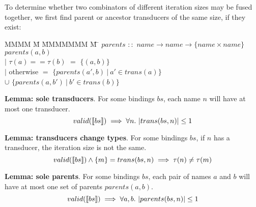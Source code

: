 To determine whether two combinators of different iteration sizes may be fused together, we first find parent or ancestor transducers of the same size, if they exist:
\begin{tabbing}
MMMM \= M \= MMMMMMM \= M \= \kill
$parents$ \> $::$ \> $name \to name \to \{name \times name\}$ \\
$parents(a,b)$ \\
        \> $|$ \> $\tau(a) == \tau(b)$ \> $=$    \> $\{(a, b)\}$ \\
        \> $|$ \> otherwise            \> $=$    \> $\{ parents(a', b) ~|~ a' \in trans(a) \} $      \\
        \>     \>                      \> $\cup$ \> $\{ parents(a, b') ~|~ b' \in trans(b) \} $  \\
\end{tabbing}

\textbf{Lemma: sole transducers}.
For some bindings $bs$, each name $n$ will have at most one transducer.
\[
valid(\constr{bs}) \implies \forall n.\ |trans(bs, n)| \le 1
\]

\textbf{Lemma: transducers change types}.
For some bindings $bs$, if $n$ has a transducer, the iteration size is not the same.
\[
valid(\llbracket bs \rrbracket) \wedge \{m\} = trans(bs, n) \implies \tau(n) \not= \tau(m)
\]

\textbf{Lemma: sole parents}.
For some bindings $bs$, each pair of names $a$ and $b$ will have at most one set of parents $parents(a,b)$.
\[
valid(\constr{bs}) \implies \forall a,b.\ |parents(bs, n)| \le 1
\]

